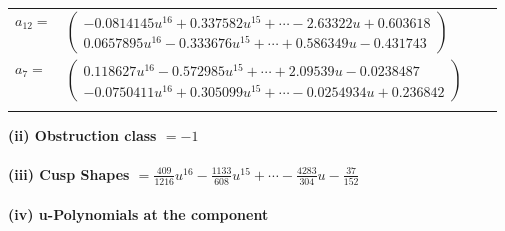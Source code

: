 \documentclass[1p]{elsarticle_modified}
\theoremstyle{definition}
\begin{document}
\begin{tabular}{m{7pt} m{180pt} m{7pt} m{180pt} }
\flushright $a_{12}=$&$\begin{pmatrix}-0.0814145 u^{16}+0.337582 u^{15}+\cdots-2.63322 u+0.603618\\0.0657895 u^{16}-0.333676 u^{15}+\cdots+0.586349 u-0.431743\end{pmatrix}$ \\
\flushright $a_{7}=$&$\begin{pmatrix}0.118627 u^{16}-0.572985 u^{15}+\cdots+2.09539 u-0.0238487\\-0.0750411 u^{16}+0.305099 u^{15}+\cdots-0.0254934 u+0.236842\end{pmatrix}$\\&\end{tabular}
\flushleft \textbf{(ii) Obstruction class $= -1$}\\~\\
\flushleft \textbf{(iii) Cusp Shapes $= \frac{409}{1216} u^{16}-\frac{1133}{608} u^{15}+\cdots-\frac{4283}{304} u-\frac{37}{152}$}\\~\\
\newpage\renewcommand{\arraystretch}{1}
\flushleft \textbf{(iv) u-Polynomials at the component}\newline \\
\end{document}
